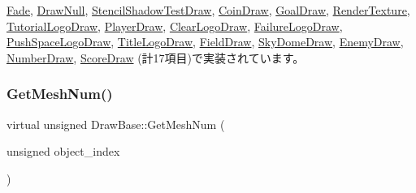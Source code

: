 \mbox{\hyperlink{class_fade_a6aed6912ebf9c243c52cb82f298d8d64}{Fade}}, \mbox{\hyperlink{class_draw_null_adede079e9c11a756090740b20bb43022}{Draw\+Null}}, \mbox{\hyperlink{class_stencil_shadow_test_draw_adfa99798c61ac13f209dc99f1e2694c5}{Stencil\+Shadow\+Test\+Draw}}, \mbox{\hyperlink{class_coin_draw_a8f5fd8668a4c66fe31446cc6f7c4afd7}{Coin\+Draw}}, \mbox{\hyperlink{class_goal_draw_a50fa9ceaaecdff9910e0f91e65ad9e95}{Goal\+Draw}}, \mbox{\hyperlink{class_render_texture_a0e9746f5cebdd088f2303e18cbc52eae}{Render\+Texture}}, \mbox{\hyperlink{class_tutorial_logo_draw_ab700e592d00574dff6ee342138343d7b}{Tutorial\+Logo\+Draw}}, \mbox{\hyperlink{class_player_draw_a8edf1441ea23f298c6a0ca707f54021a}{Player\+Draw}}, \mbox{\hyperlink{class_clear_logo_draw_af5d12b717020101e5c956cf3574f0e2a}{Clear\+Logo\+Draw}}, \mbox{\hyperlink{class_failure_logo_draw_aefc4be9e6ead4d90a5fc9c22cc07fe92}{Failure\+Logo\+Draw}}, \mbox{\hyperlink{class_push_space_logo_draw_a1ab6229ba2d68b730797f5016c99f359}{Push\+Space\+Logo\+Draw}}, \mbox{\hyperlink{class_title_logo_draw_af21cd1dbd79c741a2e3ca2b8e26c5f61}{Title\+Logo\+Draw}}, \mbox{\hyperlink{class_field_draw_a2629b4c4cd8e240e39c65b879c6e82b6}{Field\+Draw}}, \mbox{\hyperlink{class_sky_dome_draw_ab947a3d43975a6d95149bc112c08ce05}{Sky\+Dome\+Draw}}, \mbox{\hyperlink{class_enemy_draw_a6f2a052a45caf0d255112cbe81b8bfa3}{Enemy\+Draw}}, \mbox{\hyperlink{class_number_draw_a78f50afa05e728811d89a491f5eec899}{Number\+Draw}}, \mbox{\hyperlink{class_score_draw_a62aa20ef4b40544bf0a95770b925c780}{Score\+Draw}} (計17項目)で実装されています。

\mbox{\label{class_draw_base_a194eb48924f205d60d4e63c5becdd2fe}} 
\subsubsection{\texorpdfstring{Get\+Mesh\+Num()}{GetMeshNum()}}
{\footnotesize\ttfamily virtual unsigned Draw\+Base\+::\+Get\+Mesh\+Num (\begin{DoxyParamCaption}\item[{unsigned}]{object\+\_\+index }\end{DoxyParamCaption})\hspace{0.3cm}{\ttfamily [pure virtual]}}



